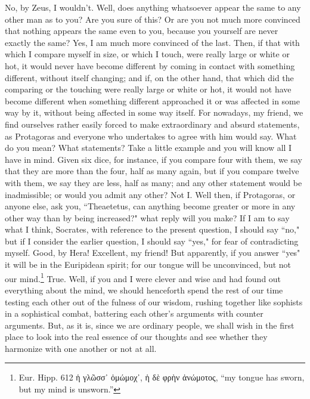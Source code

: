 \documentclass[letterpaper,12pt]{article}
\newcommand{\textgreek}[1]{\begingroup\fontencoding{LGR}\selectfont#1\endgroup}
\newcommand{\stephpag}[1]{\marginnote{\small\itshape\fontfamily{ppl}\selectfont #1}}
\begin{document}
\begin{drama}
\theaetetusspeaks
No, by Zeus, I wouldn't.
\socratesspeaks
Well, does anything whatsoever appear the same to any other man as to you? Are you sure of this? Or are you not much more convinced that nothing appears the same even to you, because you yourself are never exactly the same?
\theaetetusspeaks
Yes, I am much more convinced of the last.
\socratesspeaks
Then, if that with which I compare myself in size, or which I touch, \stephpag{b} were really large or white or hot, it would never have become different by coming in contact with something different, without itself changing; and if, on the other hand, that which did the comparing or the touching were really large or white or hot, it would not have become different when something different approached it or was affected in some way by it, without being affected in some way itself. For nowadays, my friend, we find ourselves rather easily forced to make extraordinary and absurd statements, as Protagoras and everyone who undertakes to agree with him would say.
\theaetetusspeaks
What do you mean? What statements? \stephpag{c}
\socratesspeaks
Take a little example and you will know all I have in mind. Given six dice, for instance, if you compare four with them, we say that they are more than the four, half as many again, but if you compare twelve with them, we say they are less, half as many; and any other statement would be inadmissible; or would you admit any other?
\theaetetusspeaks
Not I.
\socratesspeaks
Well then, if Protagoras, or anyone else, ask you, ``Theaetetus, can anything become greater or more in any other way than by being increased?" what reply will you make?
\theaetetusspeaks
If I am to say what I think, Socrates, with reference to \stephpag{d} the present question, I should say ``no," but if I consider the earlier question, I should say ``yes," for fear of contradicting myself.
\socratesspeaks
Good, by Hera! Excellent, my friend! But apparently, if you answer ``yes" it will be in the Euripidean spirit; for our tongue will be unconvinced, but not our mind.\footnote{Eur. Hipp. 612 \textgreek{ἡ γλῶσσ᾽ ὀμώμοχ᾽, ἡ δὲ φρὴν ἀνώμοτος}, ``my tongue has sworn, but my mind is unsworn.''}
\theaetetusspeaks
True.
\socratesspeaks
Well, if you and I were clever and wise and had found out everything about the mind, we should henceforth spend the rest of our time testing each other out of the fulness of our wisdom, \stephpag{e} rushing together like sophists in a sophistical combat, battering each other's arguments with counter arguments. But, as it is, since we are ordinary people, we shall wish in the first place to look into the real essence of our thoughts and see whether they harmonize with one another or not at all.

\end{drama}
\end{document}
